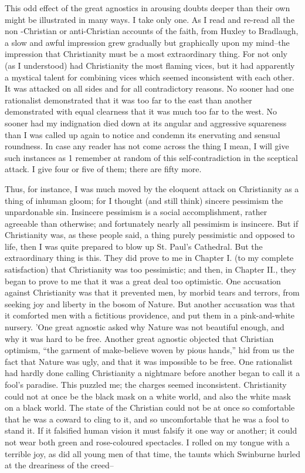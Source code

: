\documentclass{book}
\begin{document}
This odd effect of the great agnostics in arousing doubts deeper than their own might be illustrated in many ways. I take only one. As I read and re-read all the non -Christian or anti-Christian accounts of the faith, from Huxley to Bradlaugh, a slow and awful impression grew gradually but graphically upon my mind–the impression that Christianity must be a most extraordinary thing. For not only (as I understood) had Christianity the most flaming vices, but it had apparently a mystical talent for combining vices which seemed inconsistent with each other. It was attacked on all sides and for all contradictory reasons. No sooner had one rationalist demonstrated that it was too far to the east than another demonstrated with equal clearness that it was much too far to the west. No sooner had my indignation died down at its angular and aggressive squareness than I was called up again to notice and condemn its enervating and sensual roundness. In case any reader has not come across the thing I mean, I will give such instances as 1 remember at random of this self-contradiction in the sceptical attack. I give four or five of them; there are fifty more.

Thus, for instance, I was much moved by the eloquent attack on Christianity as a thing of inhuman gloom; for I thought (and still think) sincere pessimism the unpardonable sin. Insincere pessimism is a social accomplishment, rather agreeable than otherwise; and fortunately nearly all pessimism is insincere. But if Christianity was, as these people said, a thing purely pessimistic and opposed to life, then I was quite prepared to blow up St. Paul’s Cathedral. But the extraordinary thing is this. They did prove to me in Chapter I. (to my complete satisfaction) that Christianity was too pessimistic; and then, in Chapter II., they began to prove to me that it was a great deal too optimistic. One accusation against Christianity was that it prevented men, by morbid tears and terrors, from seeking joy and liberty in the bosom of Nature. But another accusation was that it comforted men with a fictitious providence, and put them in a pink-and-white nursery. ’One great agnostic asked why Nature was not beautiful enough, and why it was hard to be free. Another great agnostic objected that Christian optimism, “the garment of make-believe woven by pious hands,” hid from us the fact that Nature was ugly, and that it was impossible to be free. One rationalist had hardly done calling Christianity a nightmare before another began to call it a fool’s paradise. This puzzled me; the charges seemed inconsistent. Christianity could not at once be the black mask on a white world, and also the white mask on a black world. The state of the Christian could not be at once so comfortable that he was a coward to cling to it, and so uncomfortable that he was a fool to stand it. If it falsified human vision it must falsify it one way or another; it could not wear both green and rose-coloured spectacles. I rolled on my tongue with a terrible joy, as did all young men of that time, the taunts which Swinburne hurled at the dreariness of the creed–
\end{document}
